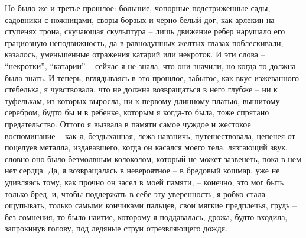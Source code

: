 Но было же и третье прошлое: большие, чопорные подстриженные сады, садовники
с  ножницами,  своры борзых  и  черно-белый  дог,  как арлекин  на  ступенях
трона, скучающая скульптура  -- лишь движение ребер  нарушало его грациозную
неподвижность,  да  в  равнодушных  желтых  глазах  поблескивали,  казалось,
уменьшенные отражения  катарий или  некроток. И  эти слова  -- ``некротки'',
``катарии''  -- сейчас  я  не знала,  что они  значили,  но когда-то  должна
была  знать.  И  теперь,  вглядываясь  в  это  прошлое,  забытое,  как  вкус
изжеванного  стебелька, я  чувствовала, что  не должна  возвращаться в  него
глубже -- ни к туфелькам, из  которых выросла, ни к первому длинному платью,
вышитому  серебром, будто  бы и  в ребенке,  которым я  когда-то была,  тоже
спрятано предательство.  Оттого я вызвала  в памяти самое чуждое  и жестокое
воспоминание --  как я, бездыханная, лежа  навзничь, путешествовала, цепенея
от поцелуев  металла, издававшего,  когда он  касался моего  тела, лязгающий
звук, словно оно было безмолвным колоколом, который не может зазвенеть, пока
в нем нет сердца. Да, я возвращалась в невероятное -- в бредовый кошмар, уже
не удивляясь тому,  как прочно он засел  в моей памяти, --  конечно, это мог
быть только бред, и, чтобы поддержать  в себе эту уверенность, я робко стала
ощупывать, только самыми кончиками пальцев, свои мягкие предплечья, грудь --
без сомнения, то было наитие,  которому я поддавалась, дрожа, будто входила,
запрокинув голову, под ледяные струи отрезвляющего дождя.

